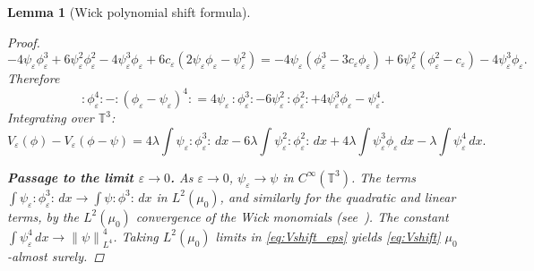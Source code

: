 \documentclass[11pt,a4paper]{article}
\newtheorem{lemma}[theorem]{Lemma}
\theoremstyle{definition}
\newcommand{\T}{\mathbb{T}}
\newcommand{\norm}[1]{\left\|#1\right\|}
\newcommand{\wick}[1]{:\!#1\!:}
\begin{document}
\begin{lemma}[Wick polynomial shift formula]
\begin{proof}
\[
-4\psi_\varepsilon\phi_\varepsilon^3 + 6\psi_\varepsilon^2\phi_\varepsilon^2 - 4\psi_\varepsilon^3\phi_\varepsilon
+ 6c_\varepsilon(2\psi_\varepsilon\phi_\varepsilon - \psi_\varepsilon^2)
= -4\psi_\varepsilon(\phi_\varepsilon^3-3c_\varepsilon\phi_\varepsilon) + 6\psi_\varepsilon^2(\phi_\varepsilon^2-c_\varepsilon) - 4\psi_\varepsilon^3\phi_\varepsilon.
\]
Therefore
\[
\wick{\phi_\varepsilon^4} - \wick{(\phi_\varepsilon-\psi_\varepsilon)^4}
= 4\psi_\varepsilon\,\wick{\phi_\varepsilon^3} - 6\psi_\varepsilon^2\,\wick{\phi_\varepsilon^2} + 4\psi_\varepsilon^3\phi_\varepsilon - \psi_\varepsilon^4.
\]
Integrating over $\T^3$:
\begin{equation}\label{eq:Vshift_eps}
V_\varepsilon(\phi) - V_\varepsilon(\phi-\psi)
= 4\lambda\!\int\psi_\varepsilon\wick{\phi_\varepsilon^3}\,dx - 6\lambda\!\int\psi_\varepsilon^2\wick{\phi_\varepsilon^2}\,dx
  + 4\lambda\!\int\psi_\varepsilon^3\phi_\varepsilon\,dx - \lambda\!\int\psi_\varepsilon^4\,dx.
\end{equation}

\noindent\textbf{Passage to the limit $\varepsilon\to 0$.}
As $\varepsilon\to 0$, $\psi_\varepsilon\to\psi$ in $C^\infty(\T^3)$.
The terms $\int\psi_\varepsilon\wick{\phi_\varepsilon^3}\,dx\to\int\psi\wick{\phi^3}\,dx$ in $L^2(\mu_0)$, and similarly for the quadratic and linear terms, by the $L^2(\mu_0)$ convergence of the Wick monomials (see~\cite[Chapter~I]{Simon1974}).
The constant $\int\psi_\varepsilon^4\,dx\to\norm{\psi}_{L^4}^4$.
Taking $L^2(\mu_0)$ limits in \eqref{eq:Vshift_eps} yields \eqref{eq:Vshift} $\mu_0$-almost surely.
\end{proof}
\end{lemma}
\end{document}
